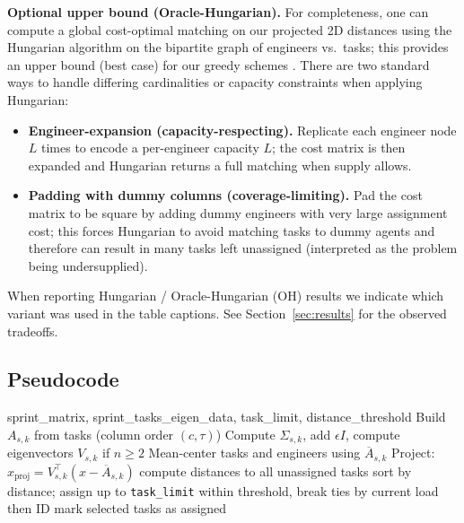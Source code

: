 \documentclass[final,1p,times]{elsarticle}
\begin{document}
\noindent\textbf{Optional upper bound (Oracle-Hungarian).} For completeness, one can compute a global cost-optimal matching on our projected 2D distances using the Hungarian algorithm on the bipartite graph of engineers vs.\ tasks; this provides an upper bound (best case) for our greedy schemes \cite{kuhn1955hungarian,BurkardAssignmentBook}. There are two standard ways to handle differing cardinalities or capacity constraints when applying Hungarian:
\begin{itemize}[leftmargin=*]
    \item \textbf{Engineer-expansion (capacity-respecting).} Replicate each engineer node $L$ times to encode a per-engineer capacity $L$; the cost matrix is then expanded and Hungarian returns a full matching when supply allows.
    \item \textbf{Padding with dummy columns (coverage-limiting).} Pad the cost matrix to be square by adding dummy engineers with very large assignment cost; this forces Hungarian to avoid matching tasks to dummy agents and therefore can result in many tasks left unassigned (interpreted as the problem being undersupplied).
\end{itemize}
When reporting Hungarian / Oracle-Hungarian (OH) results we indicate which variant was used in the table captions. See Section~\ref{sec:results} for the observed tradeoffs.

\subsection{Pseudocode}
\begin{algorithm}[H]
\caption{Sprint-level projection and assignment}
\label{alg:assign}
\begin{algorithmic}[1]
\Require sprint\_matrix, sprint\_tasks\_eigen\_data, task\_limit, distance\_threshold
    \State Build $A_{s,k}$ from tasks (column order $(c,\tau)$)
    \State Compute $\Sigma_{s,k}$, add $\epsilon I$, compute eigenvectors $V_{s,k}$ if $n\ge2$
    \State Mean-center tasks and engineers using $\overline{A}_{s,k}$
    \State Project: $x_{\text{proj}} = V_{s,k}^\top (x - \overline{A}_{s,k})$
      \State compute distances to all unassigned tasks
      \State sort by distance; assign up to \texttt{task\_limit} within threshold, break ties by current load then ID
      \State mark selected tasks as assigned
    \EndFor
  \EndFor
\EndFor
\end{algorithmic}
\end{algorithm}
\end{document}
